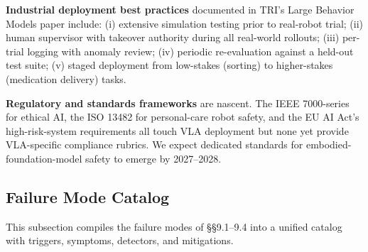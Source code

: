 \documentclass{article}
\begin{document}
\textbf{Industrial deployment best practices} documented in TRI's Large Behavior Models paper \cite{barreiros2026acarefulexaminatio} include: (i) extensive simulation testing prior to real-robot trial; (ii) human supervisor with takeover authority during all real-world rollouts; (iii) per-trial logging with anomaly review; (iv) periodic re-evaluation against a held-out test suite; (v) staged deployment from low-stakes (sorting) to higher-stakes (medication delivery) tasks.

\textbf{Regulatory and standards frameworks} are nascent. The IEEE 7000-series for ethical AI, the ISO 13482 for personal-care robot safety, and the EU AI Act's high-risk-system requirements all touch VLA deployment but none yet provide VLA-specific compliance rubrics. We expect dedicated standards for embodied-foundation-model safety to emerge by 2027--2028.

\subsection{Failure Mode Catalog}\label{failure-mode-catalog}

This subsection compiles the failure modes of §§9.1--9.4 into a unified catalog with triggers, symptoms, detectors, and mitigations.
\end{document}
